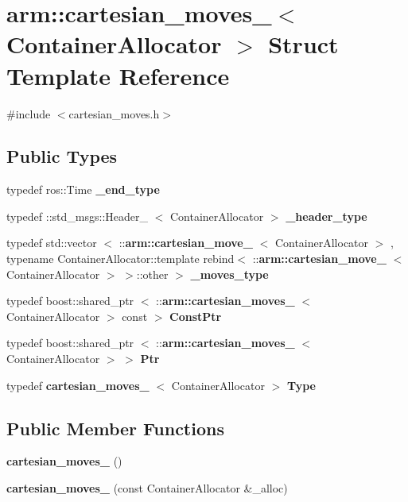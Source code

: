 \section{arm\-:\-:cartesian\-\_\-moves\-\_\-$<$ \-Container\-Allocator $>$ \-Struct \-Template \-Reference}
\label{structarm_1_1cartesian__moves__}


{\ttfamily \#include $<$cartesian\-\_\-moves.\-h$>$}

\subsection*{\-Public \-Types}
\begin{DoxyCompactItemize}
\item 
typedef ros\-::\-Time {\bf \-\_\-end\-\_\-type}
\item 
typedef \-::std\-\_\-msgs\-::\-Header\-\_\-\*
$<$ \-Container\-Allocator $>$ {\bf \-\_\-header\-\_\-type}
\item 
typedef std\-::vector\*
$<$ \-::{\bf arm\-::cartesian\-\_\-move\-\_\-}\*
$<$ \-Container\-Allocator $>$\*
, typename \*
\-Container\-Allocator\-::template \*
rebind$<$ \-::{\bf arm\-::cartesian\-\_\-move\-\_\-}\*
$<$ \-Container\-Allocator $>$\*
 $>$\-::other $>$ {\bf \-\_\-moves\-\_\-type}
\item 
typedef boost\-::shared\-\_\-ptr\*
$<$ \-::{\bf arm\-::cartesian\-\_\-moves\-\_\-}\*
$<$ \-Container\-Allocator $>$ const  $>$ {\bf \-Const\-Ptr}
\item 
typedef boost\-::shared\-\_\-ptr\*
$<$ \-::{\bf arm\-::cartesian\-\_\-moves\-\_\-}\*
$<$ \-Container\-Allocator $>$ $>$ {\bf \-Ptr}
\item 
typedef {\bf cartesian\-\_\-moves\-\_\-}\*
$<$ \-Container\-Allocator $>$ {\bf \-Type}
\end{DoxyCompactItemize}
\subsection*{\-Public \-Member \-Functions}
\begin{DoxyCompactItemize}
\item 
{\bf cartesian\-\_\-moves\-\_\-} ()
\item 
{\bf cartesian\-\_\-moves\-\_\-} (const \-Container\-Allocator \&\-\_\-alloc)
\end{DoxyCompactItemize}

